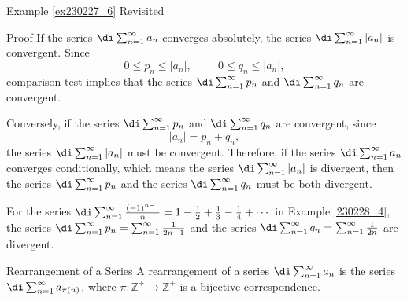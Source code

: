 \begin{example}{\linkt Example \ref{ex230227_6} Revisited}
\begin{example}[label=ex230227_13]{}
\begin{myproof}{Proof}
If the series  $\di\sum_{n=1}^{\infty}a_n$ converges absolutely, the series  $\di\sum_{n=1}^{\infty}|a_n|$ is convergent.
Since
\[0\leq p_n\leq|a_n|,\hspace{1cm}0\leq q_n\leq |a_n|,\]
comparison test implies that the series $\di\sum_{n=1}^{\infty}p_n$ and $\di\sum_{n=1}^{\infty}q_n$ are convergent.

Conversely, if  the series $\di\sum_{n=1}^{\infty}p_n$ and $\di\sum_{n=1}^{\infty}q_n$ are convergent, since
\[|a_n|=p_n+q_n,\]
the series $\di\sum_{n=1}^{\infty}|a_n|$ must be convergent. Therefore, if the series $\di\sum_{n=1}^{\infty}a_n$ converges conditionally, which means the series $\di\sum_{n=1}^{\infty}|a_n|$ is divergent, then the series $\di\sum_{n=1}^{\infty}p_n$ and the series $\di\sum_{n=1}^{\infty}q_n$ must be both divergent.
\end{myproof}
 \begin{example} {}For the series $\di\sum_{n=1}^{\infty}\frac{(-1)^{n-1}}{n}=1-\frac{1}{2}+\frac{1}{3}-\frac{1}{4}+\cdots$ in Example \ref{230228_4},
the series $\di\sum_{n=1}^{\infty}p_{n}=\sum_{n=1}^{\infty}\frac{1}{2n-1}$ and the series  $\di\sum_{n=1}^{\infty}q_{n}=\sum_{n=1}^{\infty}\frac{1}{2n}$ are divergent. 
\end{example}

\begin{definition}{Rearrangement of a Series}
A rearrangement of a series $\di\sum_{n=1}^{\infty}a_n$ is the series $\di\sum_{n=1}^{\infty}a_{\pi(n)}$, where $\pi:\mathbb{Z}^+\to\mathbb{Z}^+$ is a bijective correspondence.
\end{definition}


\end{example}
\end{example}

